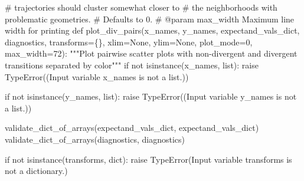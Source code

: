 \documentclass[
  letterpaper,
  DIV=11,
  numbers=noendperiod]{scrartcl}
\newenvironment{Shaded}{\begin{snugshade}}{\end{snugshade}}
\newcommand{\BuiltInTok}[1]{\textcolor[rgb]{0.00,0.23,0.31}{#1}}
\newcommand{\CommentTok}[1]{\textcolor[rgb]{0.37,0.37,0.37}{#1}}
\newcommand{\ControlFlowTok}[1]{\textcolor[rgb]{0.00,0.23,0.31}{#1}}
\newcommand{\DecValTok}[1]{\textcolor[rgb]{0.68,0.00,0.00}{#1}}
\newcommand{\KeywordTok}[1]{\textcolor[rgb]{0.00,0.23,0.31}{#1}}
\newcommand{\NormalTok}[1]{\textcolor[rgb]{0.00,0.23,0.31}{#1}}
\newcommand{\OperatorTok}[1]{\textcolor[rgb]{0.37,0.37,0.37}{#1}}
\newcommand{\PreprocessorTok}[1]{\textcolor[rgb]{0.68,0.00,0.00}{#1}}
\newcommand{\StringTok}[1]{\textcolor[rgb]{0.13,0.47,0.30}{#1}}
\newcommand{\VariableTok}[1]{\textcolor[rgb]{0.07,0.07,0.07}{#1}}
\begin{document}
\begin{Shaded}
\begin{Highlighting}[]
\CommentTok{\#                        trajectories should cluster somewhat closer to}
\CommentTok{\#                        the neighborhoods with problematic geometries.}
\CommentTok{\#                   Defaults to 0.}
\CommentTok{\# @param max\_width Maximum line width for printing}
\KeywordTok{def}\NormalTok{ plot\_div\_pairs(x\_names, y\_names, expectand\_vals\_dict,}
\NormalTok{                   diagnostics, transforms}\OperatorTok{=}\NormalTok{\{\},}
\NormalTok{                   xlim}\OperatorTok{=}\VariableTok{None}\NormalTok{, ylim}\OperatorTok{=}\VariableTok{None}\NormalTok{, }
\NormalTok{                   plot\_mode}\OperatorTok{=}\DecValTok{0}\NormalTok{, max\_width}\OperatorTok{=}\DecValTok{72}\NormalTok{):}
  \CommentTok{"""Plot pairwise scatter plots with non{-}divergent and divergent }
\CommentTok{     transitions separated by color"""}
  \ControlFlowTok{if} \KeywordTok{not} \BuiltInTok{isinstance}\NormalTok{(x\_names, }\BuiltInTok{list}\NormalTok{):}
    \ControlFlowTok{raise} \PreprocessorTok{TypeError}\NormalTok{((}\StringTok{\textquotesingle{}Input variable \textasciigrave{}x\_names\textasciigrave{} is not a list.\textquotesingle{}}\NormalTok{))}

  \ControlFlowTok{if} \KeywordTok{not} \BuiltInTok{isinstance}\NormalTok{(y\_names, }\BuiltInTok{list}\NormalTok{):}
    \ControlFlowTok{raise} \PreprocessorTok{TypeError}\NormalTok{((}\StringTok{\textquotesingle{}Input variable \textasciigrave{}y\_names\textasciigrave{} is not a list.\textquotesingle{}}\NormalTok{))}
    
\NormalTok{  validate\_dict\_of\_arrays(expectand\_vals\_dict, }\StringTok{\textquotesingle{}expectand\_vals\_dict\textquotesingle{}}\NormalTok{)}
\NormalTok{  validate\_dict\_of\_arrays(diagnostics, }\StringTok{\textquotesingle{}diagnostics\textquotesingle{}}\NormalTok{)}

  \ControlFlowTok{if} \KeywordTok{not} \BuiltInTok{isinstance}\NormalTok{(transforms, }\BuiltInTok{dict}\NormalTok{):}
    \ControlFlowTok{raise} \PreprocessorTok{TypeError}\NormalTok{(}\StringTok{\textquotesingle{}Input variable \textasciigrave{}transforms\textasciigrave{} is not a dictionary.\textquotesingle{}}\NormalTok{)}
  

\end{Highlighting}
\end{Shaded}
\end{document}
